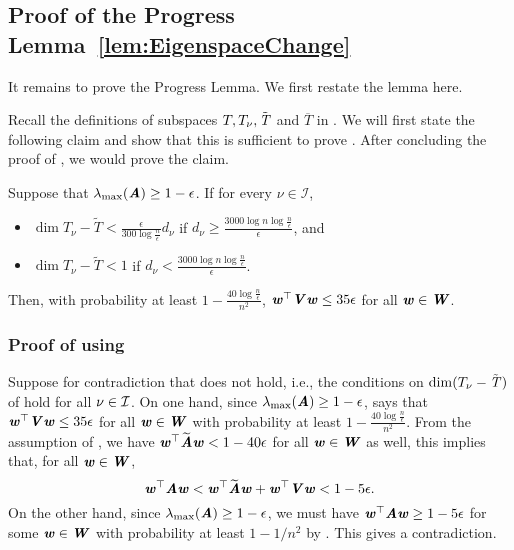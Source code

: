 \subsection{Proof of the Progress Lemma~\ref{lem:EigenspaceChange}}\label{sec:progress}
It remains to prove the Progress Lemma. We first restate the lemma here.

\progress*
Recall the definitions of subspaces $T,T_\nu,\Ttil$ and $\overline{T}$ in .
We will first state the following claim and show that this is sufficient to prove . After concluding the proof of , we would prove the claim.

\begin{claim}\label{cl:progress} Suppose that $\lambda_{\max}(\AA) \geq 1-\epsilon$. If for every $\nu \in \mathcal{I}$, 
\begin{itemize}
\item $\dim{T_{\nu} -\tilde{T}} < \frac{\epsilon}{300\log\frac{n}{\epsilon}} d_{\nu}$ if $d_{\nu} \geq \frac{3000\log n\log\frac{n}{\epsilon}}{\epsilon}$, and 
\item $\dim{T_{\nu} -\tilde{T}} < 1$ if $d_{\nu} < \frac{3000\log n\log\frac{n}{\epsilon}}{\epsilon}$.
\end{itemize}
Then, with probability at least $1-\frac{40\log\frac{n}{\epsilon}}{n^2}$, $\ww^{\top}\VV\ww\leq 35 \epsilon$ for all $\ww\in \WW$.
\end{claim}
\subsubsection*{Proof of  using }
Suppose for contradiction that  does not hold, i.e., the conditions on $\dim{T_\nu-\Ttil}$ of  hold for all $\nu \in \cal{I}$.
 On one hand, since $\lambda_{\max}(\AA)\geq 1-\epsilon$,  says that $\ww^{\top}\VV\ww\leq 35 \epsilon$ for all $\ww \in \WW$ with probability at least $1-\frac{40\log\frac{n}{\epsilon}}{n^2}$.
 From the assumption of , we have $\ww^{\top}\AAtil\ww < 1- 40\epsilon$ for all $\ww\in \WW$ as well, this implies that, for all $\ww \in \WW$,
\[
\ww^{\top}\AA\ww < \ww^{\top}\AAtil\ww +\ww^{\top}\VV\ww < 1-5\epsilon.
\]
On the other hand, since $\lambda_{\max}(\AA)\geq 1- \epsilon$, we must have  $\ww^{\top}\AA\ww \geq 1-5\epsilon$ for some $\ww\in \WW$ with probability at least $1-1/n^2$ by  .
This gives a contradiction. 

